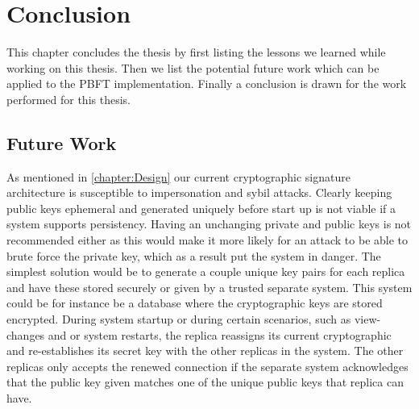 \chapter{Conclusion}
\label{chapter:Con}
This chapter concludes the thesis by first listing the lessons we learned while working on this thesis. Then we list the potential future work which can be applied to the PBFT implementation.
Finally a conclusion is drawn for the work performed for this thesis.



\section{Future Work}
As mentioned in \autoref{chapter:Design} our current cryptographic signature architecture is susceptible to impersonation  and sybil attacks. Clearly keeping public keys ephemeral and generated uniquely before start up is not viable if a system supports persistency. Having an unchanging private and public keys is not recommended either as this would make it more likely for an attack to be able to brute force the private key, which as a result put the system in danger. The simplest solution would be to generate a couple unique key pairs for each replica and have these stored securely or given by a trusted separate system. This system could be for instance be a database where the cryptographic keys are stored encrypted. During system startup or during certain scenarios, such as view-changes and or system restarts, the replica reassigns its current cryptographic and re-establishes its secret key with the other replicas in the system. The other replicas only accepts the renewed connection if the separate system acknowledges that the public key given matches one of the unique public keys that replica can have.

